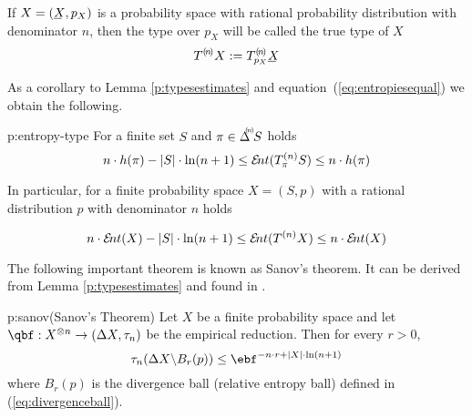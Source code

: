   
  If $X=(\un X,p_{X})$ is a probability space with rational probability
  distribution with denominator $n$, then the type over $p_{X}$ will be
  called the true type of $X$
  \[
  T^{\c n}X
  :=
  T^{\c n}_{p_{X}}\un X
  \]
  
  As a corollary to Lemma \ref{p:typesestimates} and
  equation~(\ref{eq:entropiesequal}) we obtain the following.
  
  \begin{corollary}{p:entropy-type}
    For a finite set $S$ and $\pi\in\Delta^{\!\!\!^{(\!n\!)}}\! S$ holds
    \[
      n\cdot h(\pi)- |S| \cdot \ln (n+1)
      \leq
      \ent(T^{(n)}_{\pi}S)
      \leq
      n\cdot h(\pi)
    \]

    In particular, for a finite probability space $X=(S,p)$ with a rational
    distribution $p$ with denominator $n$ holds

    \[
      n\cdot\ent(X)- |S| \cdot \ln (n+1)
      \leq
      \ent(T^{(n)}X)
      \leq
      n\cdot \ent(X)
    \]
    
  \end{corollary}
  
  The following important theorem is known as Sanov's theorem. 
  It can be derived from Lemma
  \ref{p:typesestimates} and found in \cite{Cover-Elements-1991}.
  
  \begin{theorem}{p:sanov}{\rm (Sanov's Theorem)}
    Let $X$ be a finite probability space and let $\emp: X^{\otimes n}
    \to (\Delta X, \tau_n)$ be the empirical reduction.  Then for
    every $r>0$,
    \[
      \tau_n(\Delta X \backslash B_r(p)) 
      \leq 
      \ebf^{- n \cdot r + |X| \cdot \ln( n + 1 )}
    \]
    where $B_r(p)$ is the divergence ball (relative entropy ball)
    defined in (\ref{eq:divergenceball}).
  \end{theorem}

